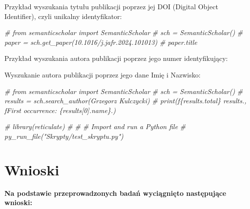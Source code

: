 \documentclass[
  12pt,
]{article}
\newenvironment{Shaded}{\begin{snugshade}}{\end{snugshade}}
\newcommand{\CommentTok}[1]{\textcolor[rgb]{0.56,0.35,0.01}{\textit{#1}}}
\begin{document}
Przykład wyszukania tytułu publikacji poprzez jej DOI (Digital Object
Identifier), czyli unikalny identyfikator:

\begin{Shaded}
\begin{Highlighting}[]

\CommentTok{\# from semanticscholar import SemanticScholar}
\CommentTok{\# sch = SemanticScholar()}
\CommentTok{\# paper = sch.get\_paper(\textquotesingle{}10.1016/j.jafr.2024.101013\textquotesingle{})}
\CommentTok{\# paper.title}
\end{Highlighting}
\end{Shaded}

Przykład wyszukania autora publikacji poprzez jego numer identyfikujący:

Wyszukanie autora publikacji poprzez jego dane Imię i Nazwisko:

\begin{Shaded}
\begin{Highlighting}[]

\CommentTok{\# from semanticscholar import SemanticScholar}
\CommentTok{\# sch = SemanticScholar()}
\CommentTok{\# results = sch.search\_author(\textquotesingle{}Grzegorz Kulczycki\textquotesingle{})}
\CommentTok{\# print(f\textquotesingle{}\{results.total\} results.\textquotesingle{}, f\textquotesingle{}First occurrence: \{results[0].name\}.\textquotesingle{})}
\end{Highlighting}
\end{Shaded}

\begin{Shaded}
\begin{Highlighting}[]
\CommentTok{\# library(reticulate)}
\CommentTok{\# }
\CommentTok{\# \# Import and run a Python file}
\CommentTok{\# py\_run\_file("Skrypty/test\_skryptu.py")}
\end{Highlighting}
\end{Shaded}

\FloatBarrier
\newpage
{}

\hypertarget{wnioski}{%
\section{Wnioski}\label{wnioski}}

\textbf{Na podstawie przeprowadzonych badań wyciągnięto następujące
wnioski:}
\end{document}
